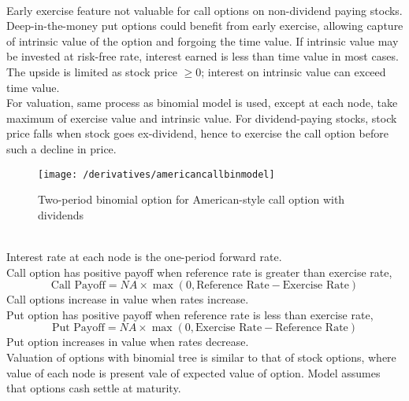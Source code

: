 \begin{remark} \\
Early exercise feature not valuable for call options on non-dividend paying stocks.\\
Deep-in-the-money put options could benefit from early exercise, allowing capture of intrinsic value of the option and forgoing the time value. If intrinsic value may be invested at risk-free rate, interest earned is less than time value in most cases. The upside is limited as stock price $\geq 0$; interest on intrinsic value can exceed time value.\\
For valuation, same process as binomial model is used, except at each node, take maximum of exercise value and intrinsic value. For dividend-paying stocks, stock price falls when stock goes ex-dividend, hence to exercise the call option before such a decline in price.
\end{remark}

\begin{figure}[H]
\centering
\texttt{[image: /derivatives/americancallbinmodel]}
\caption{Two-period binomial option for American-style call option with dividends}
\end{figure}

\begin{remark} \\
Interest rate at each node is the one-period forward rate.\\
Call option has positive payoff when reference rate is greater than exercise rate,
\begin{equation}
\text{Call Payoff} = NA \times \max(0, \text{Reference Rate} - \text{Exercise Rate}) \nonumber
\end{equation}
Call options increase in value when rates increase.\\
Put option has positive payoff when reference rate is less than exercise rate,
\begin{equation}
\text{Put Payoff} = NA \times \max(0, \text{Exercise Rate} - \text{Reference Rate}) \nonumber
\end{equation}
Put option increases in value when rates decrease.\\
Valuation of options with binomial tree is similar to that of stock options, where value of each node is present vale of expected value of option. Model assumes that options cash settle at maturity.
\end{remark}

